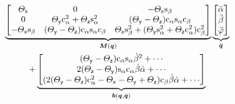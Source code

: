 \begin{multline}\label{eq:LagrangeEqRBAttitude}
 \underbrace{\begin{bmatrix}
  \Jx & 0 & -\Jx \spit \\
  0 & \Jy\crol^2 + \Jz\srol^2 & (\Jy-\Jz)\crol\srol\cpit \\
  -\Jx \spit & (\Jy-\Jz)\crol\srol\cpit & \Jx\spit^2 + (\Jy\srol^2 + \Jz\crol^2)\cpit^2 
 \end{bmatrix}}_{\sysInertiaMat(\genCoord)}
 \underbrace{\begin{bmatrix} \roldd \\ \pitdd \\ \yawdd \end{bmatrix}}_{\genCoorddd}
\\
 + \underbrace{\begin{bmatrix}
  (\Jy-\Jz)\crol\srol \pitd^2 + \cdots \\ %
  2(\Jz-\Jy)\srol\crol\pitd \rold + \cdots \\ %
  (2(\Jy-\Jz)\crol^2 - \Jx - \Jy + \Jz)\cpit \pitd \rold + \cdots \\ %
 \end{bmatrix}}_{\sysForce(\genCoord, \genCoordd)}

\end{multline}
